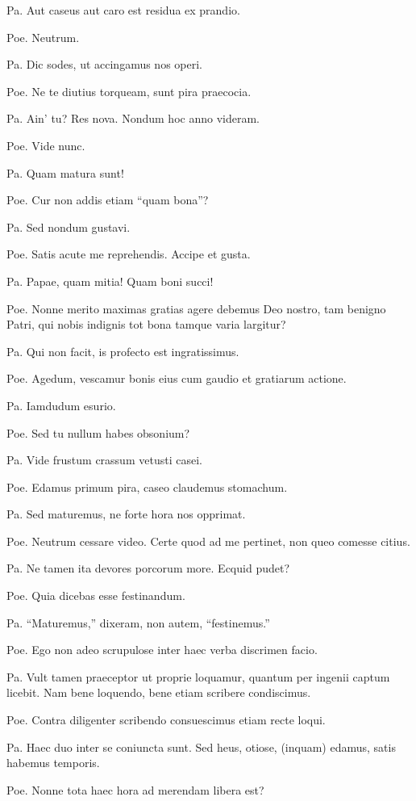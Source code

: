 \documentclass{article}
\begin{document}
Pa. Aut caseus aut caro est residua ex prandio.

Poe. Neutrum.

Pa. Dic sodes, ut accingamus nos operi.

Poe. Ne te diutius torqueam, sunt pira praecocia.

Pa. Ain' tu? Res nova. Nondum hoc anno videram.

Poe. Vide nunc.

Pa. Quam matura sunt!

Poe. Cur non addis etiam ``quam bona''?

Pa. Sed nondum gustavi.

Poe. Satis acute me reprehendis. Accipe et gusta.

Pa. Papae, quam mitia! Quam boni succi!

Poe. Nonne merito maximas gratias agere debemus Deo nostro, tam benigno Patri, qui nobis indignis tot bona tamque varia largitur?

Pa. Qui non facit, is profecto est ingratissimus.

Poe. Agedum, vescamur bonis eius cum gaudio et gratiarum actione.

Pa. Iamdudum esurio.

Poe. Sed tu nullum habes obsonium?

Pa. Vide frustum crassum vetusti casei.

Poe. Edamus primum pira, caseo claudemus stomachum.

Pa. Sed maturemus, ne forte hora nos opprimat.

Poe. Neutrum cessare video. Certe quod ad me pertinet, non queo comesse citius.

Pa. Ne tamen ita devores porcorum more. Ecquid pudet?

Poe. Quia dicebas esse festinandum.

Pa. ``Maturemus,'' dixeram, non autem, ``festinemus.''

Poe. Ego non adeo scrupulose inter haec verba discrimen facio.

Pa. Vult tamen praeceptor ut proprie loquamur, quantum per ingenii captum licebit. Nam bene loquendo, bene etiam scribere condiscimus.

Poe. Contra diligenter scribendo consuescimus etiam recte loqui.

Pa. Haec duo inter se coniuncta sunt. Sed heus, otiose, (inquam) edamus, satis habemus temporis.

Poe. Nonne tota haec hora ad merendam libera est?
\end{document}
